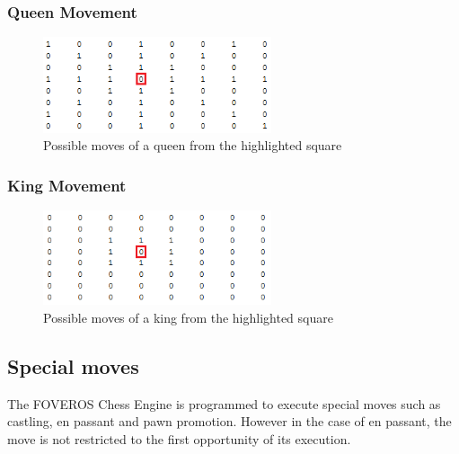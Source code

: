 \documentclass[11pt,a4paper]{article}
\begin{document}
\subsubsection{Queen Movement}
\begin{figure}[H]
\centering
\includegraphics[width=0.6\textwidth]{queen_movement}
\caption{Possible moves of a queen from the highlighted square}
\label{fig:chess1}
\end{figure}

\subsubsection{King Movement}
\begin{figure}[H]
\centering
\includegraphics[width=0.6\textwidth]{king_movement}
\caption{Possible moves of a king from the highlighted square}
\label{fig:chess1}
\end{figure}


\subsection{Special moves}
The FOVEROS Chess Engine is programmed to execute special moves such as castling, en passant and pawn promotion. 
However in the case of en passant, the move is not restricted to the first opportunity of its execution.
\end{document}
